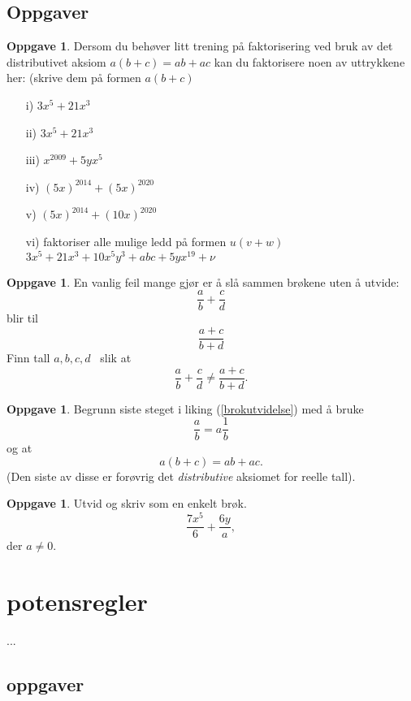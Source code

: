 \documentclass[11pt]{article}
\theoremstyle{definition}
\newtheorem{oppgave}[theorem]{Oppgave}
\theoremstyle{definition}
\begin{document}
\subsection{Oppgaver}
\begin{oppgave}
Dersom du behøver litt trening på faktorisering ved bruk av
det distributivet aksiom $a(b + c) = ab + ac$ kan du faktorisere
noen av uttrykkene her: (skrive dem på formen $a(b + c)$
\begin{itemize}
\item[i)]
    $3x^5 + 21x^3$
\item[ii)]
    $3x^5 + 21x^3$
\item[iii)]
    $x^{2009} + 5yx^5$
\item[iv)]
    $(5x)^{2014} + (5x)^{2020}$
\item[v)]
    $(5x)^{2014} + (10x)^{2020}$
\item[vi)]
    faktoriser alle mulige ledd på formen $u(v + w)$ \newline
    $3x^5 + 21x^3 + 10x^5y^3 + abc + 5yx^{19} + \nu$
\end{itemize}
\end{oppgave}

\begin{oppgave}
En vanlig feil mange gjør er å slå sammen brøkene uten å utvide:
\[\frac{a}{b} + \frac{c}{d} \] blir til \[\frac{a + c}{b + d} \]
Finn tall $a,b,c,d$  slik at
\[\frac{a}{b} + \frac{c}{d} \neq \frac{a + c}{b + d} .\]
\end{oppgave}

\begin{oppgave}
Begrunn siste steget i liking (\ref{brokutvidelse}) med å bruke
\[\frac{a}{b} = a\frac{1}{b}\] og at \[a(b + c) = ab + ac.\]
(Den siste av disse er forøvrig det \emph{distributive} aksiomet for
 reelle tall).
\end{oppgave}

\begin{oppgave}
Utvid og skriv som en enkelt brøk.
\[\frac{7x^5}{6} + \frac{6y}{a},\]
der $a \neq 0$.
\end{oppgave}


\section{potensregler}
...

\subsection{oppgaver}
\end{document}
